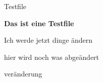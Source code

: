 \documentclass[10pt,a4paper]{article}
\begin{document}
\caption{Testfile}

\textbf{Das ist eine Testfile}

Ich werde jetzt dinge ändern


hier wird noch was abgeändert

veränderung
\end{document}
